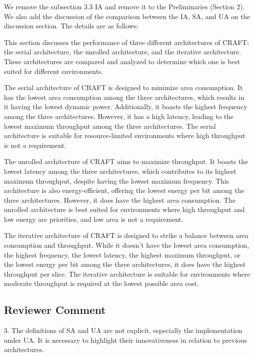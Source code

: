 We remove the subsection 3.3 IA and remove it to the Preliminaries (Section 2). We also add the discussion of the comparison between the IA, SA, and UA on the discussion section. The details are as follows:

\color{blue}
This section discusses the performance of three different architectures of CRAFT: the serial architecture, the unrolled architecture, and the iterative architecture. These architectures are compared and analyzed to determine which one is best suited for different environments.

The serial architecture of CRAFT is designed to minimize area consumption. It has the lowest area consumption among the three architectures, which results in it having the lowest dynamic power. Additionally, it boasts the highest frequency among the three architectures. However, it has a high latency, leading to the lowest maximum throughput among the three architectures. The serial architecture is suitable for resource-limited environments where high throughput is not a requirement.

The unrolled architecture of CRAFT aims to maximize throughput. It boasts the lowest latency among the three architectures, which contributes to its highest maximum throughput, despite having the lowest maximum frequency. This architecture is also energy-efficient, offering the lowest energy per bit among the three architectures. However, it does have the highest area consumption. The unrolled architecture is best suited for environments where high throughput and low energy are priorities, and low area is not a requirement.

The iterative architecture of CRAFT is designed to strike a balance between area consumption and throughput. While it doesn't have the lowest area consumption, the highest frequency, the lowest latency, the highest maximum throughput, or the lowest energy per bit among the three architectures, it does have the highest throughput per slice. The iterative architecture is suitable for environments where moderate throughput is required at the lowest possible area cost.
\color{black}



\subsection{Reviewer Comment}
3. The definitions of SA and UA are not explicit, especially the implementation under UA. It is necessary to highlight their innovativeness in relation to previous architectures.

